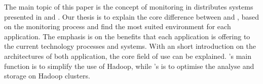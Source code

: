 
The main topic of this paper is the concept of monitoring in distributes systems presented in \ambshort and \chukshort. 
Our thesis is to explain the core difference between \ambshort and \chukshort, based on the monitoring process and find the most suited environment for each application. 
The emphasis is on the benefits that each application is offering to the current technology processes and systems. 
With an short introduction on the architectures of both application, the core field of use can be explained. 
\ambshort's main function is to simplify the use of Hadoop, while \chukshort's is to optimise the analyse and storage on Hadoop clusters. 